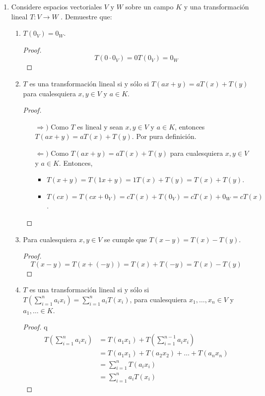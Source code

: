 \documentclass[11pt,letterpaper]{article}
\begin{document}
\begin{enumerate}
\item Considere espacios vectoriales $V$ y $W$ sobre un campo $K$ y una transformación lineal
$T : V \to W$ . Demuestre que:
\begin{enumerate}[label=(\alph*)]
    \item $T(0_V) = 0_W$.
    \begin{proof}
        \[ T(0 \cdot 0_V) = 0 T(0_V) = 0_W \]
    \end{proof}
    
    \item $T$ es una transformación lineal si y sólo si $T (ax + y) = aT (x) + T(y)$ para
    cualesquiera $x,y \in V$ y $a \in K$.
    \begin{proof}
        \hfill
        \begin{itemize}
            \item[$\Longrightarrow)$] Como $T$ es lineal y sean $x,y \in V$ y $a \in K$, entonces
            $T(ax + y) = aT(x) + T(y)$. Por pura definición.
    
            \item[$\Longleftarrow)$] Como $T (ax + y) = aT (x) + T(y)$ para
            cualesquiera $x,y \in V$ y $a \in K$. Entonces,

            \begin{itemize}
                \item $T(x + y) = T(1x + y) = 1T(x) + T(y) = T(x) + T(y)$.
                \item $T(cx) = T(cx + 0_V) = cT(x) + T(0_V) = cT(x) + 0_W = cT(x)$.
            \end{itemize}
        \end{itemize}
    \end{proof}

    \item Para cualesquiera $x, y \in V$ se cumple que $T(x-y) = T(x)-T(y)$.
    \begin{proof}
        \[ T(x-y) = T(x + (-y)) = T(x) + T(-y) = T(x) - T(y) \]
    \end{proof}
    
    \item $T$ es una transformación lineal si y sólo si
    $T \left( \sum_{i=1}^{n} a_ix_i \right) = \sum_{i=1}^{n}a_i T(x_i)$, para cualesquiera
    $x_1, \ldots, x_n \in V$ y $a_1, \ldots \in K$.
    \begin{proof}q
        \begin{align*}
            T \left( \sum_{i=1}^{n} a_ix_i \right)
                &= T(a_1 x_1) + T \left( \sum_{i=1}^{n-1} a_ix_i \right)\\
                &= T(a_1 x_1) + T(a_2 x_2) + \ldots + T(a_n x_n)\\
                &= \sum_{i=1}^{n} T(a_i x_i)\\
                &= \sum_{i=1}^{n} a_i T(x_i)
        \end{align*}
    \end{proof}
\end{enumerate}

\end{enumerate}
\end{document}
